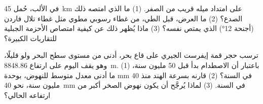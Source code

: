 \begin{exercise}[$\star\star\star$]\label{exo:g12:mountain-building:14}
في الألب، حُمل  \qty{45}{km} على امتداد  ميله
قريب من الصفر. (1) ما  الذي امتصه ذلك الصدع؟ (2) ما العرض،
قبل الطي، من غطاء رسوبي مطوي مثل غطاء تلال فاردن (أجنحة
\ang{12}) الذي يمتص  نفسه؟ (3) ماذا يُظهر ذلك عن
كيفية امتصاص الأحزمة الجبلية للتقاربات الكبيرة؟
\end{exercise}

\begin{exercise}[$\star\star\star$]\label{exo:g12:mountain-building:15}
ترسب حجر قمة إيفرست الجيري على قاع بحر، أدنى من مستوى سطح البحر ولو
قليلًا، وهو يقف اليوم على ارتفاع \qty{8848.86}{m}. (1) باعتبار
أن الاصطدام بدأ قبل 50 مليون سنة، ما أدنى معدل متوسط
للنهوض، بوحدة \unit{mm} في السنة؟ (2) قارنه بسرعة الهند منذ
40 مليون سنة، نحو \qty{40}{mm} في السنة. (3) لماذا يُرجَّح أن يكون نهوض
الصخر أكبر من ارتفاعه الحالي؟
\end{exercise}

